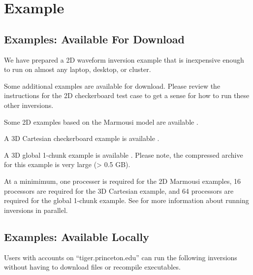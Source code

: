 \documentclass[letterpaper,10pt,english]{sphinxmanual}
\begin{document}
\chapter{Example}
\label{\detokenize{index:example}}

\section{Examples: Available For Download}
\label{\detokenize{main/example:examples-available-for-download}}\label{\detokenize{main/example::doc}}
We have prepared a 2D waveform inversion example that is inexpensive enough to run on almost any laptop, desktop, or cluster.

Some additional examples are available for download.  Please review the instructions for the 2D checkerboard test case to get a sense for how to run these other inversions.

Some 2D examples based on the Marmousi model are available .

A 3D Cartesian checkerboard example is available .

A 3D global 1-chunk example is available . Please note, the compressed archive for this example is very large (\textgreater{} 0.5 GB). 

At a minimimum, one processer is required for the 2D Marmousi examples, 16 processors are required for the 3D Cartesian example, and 64 processors are required for the global 1-chunk example.  See  for more information about running inversions in parallel.



\section{Examples: Available Locally}
\label{\detokenize{main/example:examples-available-locally}}
Users with accounts on “tiger.princeton.edu” can run the following inversions without having to download files or recompile executables.
\end{document}
